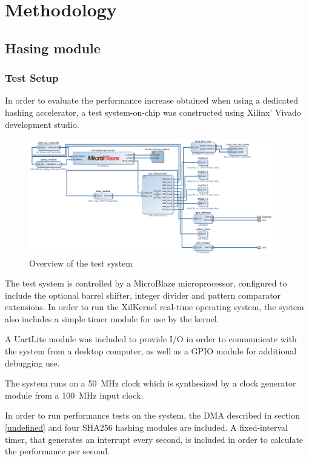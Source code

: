 \chapter{Methodology}

\section{Hasing module}

\subsection{Test Setup}
In order to evaluate the performance increase obtained when using a dedicated
hashing accelerator, a test system-on-chip was constructed using Xilinx' Vivado
development studio.

\begin{figure}[ht]
	\includegraphics[width=0.95\textwidth]{Figures/testsystem-vivado.png}
	\caption{Overview of the test system}
	\label{fig:testsystem-vivado}
\end{figure}

The test system is controlled by a MicroBlaze microprocessor, configured to
include the optional barrel shifter, integer divider and pattern comparator extensions.
In order to run the XilKernel real-time operating system, the system also
includes a simple timer module for use by the kernel.

A UartLite module was included to provide I/O in order to communicate with
the system from a desktop computer, as well as a GPIO module for additional
debugging use.

The system runs on a 50~MHz clock which is synthesized by a clock generator
module from a 100~MHz input clock.

In order to run performance tests on the system, the DMA described in
section \ref{undefined} and four
SHA256 hashing modules are included.
A fixed-interval timer, that generates an interrupt every second, is
included in order to calculate the performance per second.

